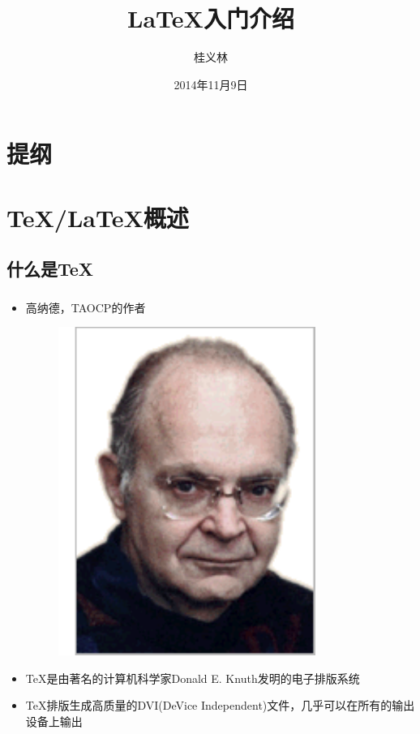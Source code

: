 \documentclass{beamer}
\title{\LaTeX 入门介绍}
\author{桂义林}
\date{2014年11月9日}
\begin{document}
  \frame{\titlepage}

  \section*{提纲}
  \frame
  {
    \frametitle{\secname}
    \tableofcontents[hideallsubsections]  %
  }

  \section{\TeX /\LaTeX 概述}

  \subsection{什么是\TeX}
  \frame
  {
    \frametitle{\subsecname}
    \begin{itemize}
    \item 高纳德，TAOCP的作者
      \begin{figure}
      \includegraphics[scale=0.4]{Knuth.pdf}
      \end{figure}
    \item \TeX 是由著名的计算机科学家Donald E. Knuth发明的电子排版系统
    \item \TeX 排版生成高质量的DVI(DeVice Independent)文件，几乎可以在所有的输出设备上输出
    \end{itemize}
  }
\end{document}
